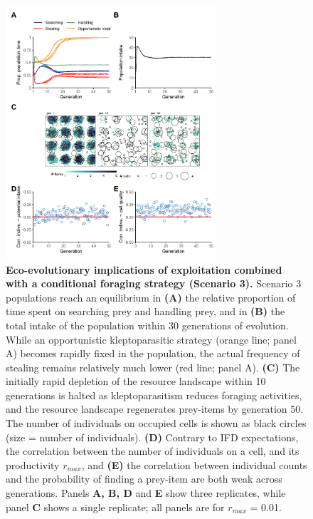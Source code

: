 \documentclass[11pt]{article}
\begin{document}
\begin{figure}[h!]
    \centering
    \includegraphics[width=0.70\textwidth]{figures/fig_04.png}
    \caption{
        \textbf{Eco-evolutionary implications of exploitation combined with a conditional foraging strategy (Scenario 3).}
        Scenario 3 populations reach an equilibrium in \textbf{(A)} the relative proportion of time spent on searching prey and handling prey, and in \textbf{(B)} the total intake of the population within 30 generations of evolution.
        While an opportunistic kleptoparasitic strategy (orange line; panel A) becomes rapidly fixed in the population, the actual frequency of stealing remains relatively much lower (red line; panel A).
        \textbf{(C)} The initially rapid depletion of the resource landscape within 10 generations is halted as kleptoparasitism reduces foraging activities, and the resource landscape regenerates prey-items by generation 50.
        The number of individuals on occupied cells is shown as black circles (size = number of individuals).
        \textbf{(D)} Contrary to IFD expectations, the correlation between the number of individuals on a cell, and its productivity $r_{max}$, and
        \textbf{(E)} the correlation between individual counts and the probability of finding a prey-item are both weak across generations.
        Panels \textbf{A, B, D} and \textbf{E} show three replicates, while panel \textbf{C} shows a single replicate; all panels are for $r_{max}$ = 0.01.
    }
    \label{Fig:Model3}
\end{figure}
\end{document}
